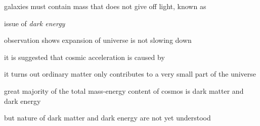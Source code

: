 galaxies must contain mass that does not give off light, known as 

\cmt issue of \emph{dark energy}

observation shows expansion of universe is not slowing down

it is suggested that cosmic acceleration is caused by 

\begin{figure}[ht]
    \centering
    \vspace*{-12pt}
\end{figure}


\cmt it turns out ordinary matter only contributes to a very small part of the universe

great majority of the total mass-energy content of cosmos is dark matter and dark energy

but nature of dark matter and dark energy are not yet understood